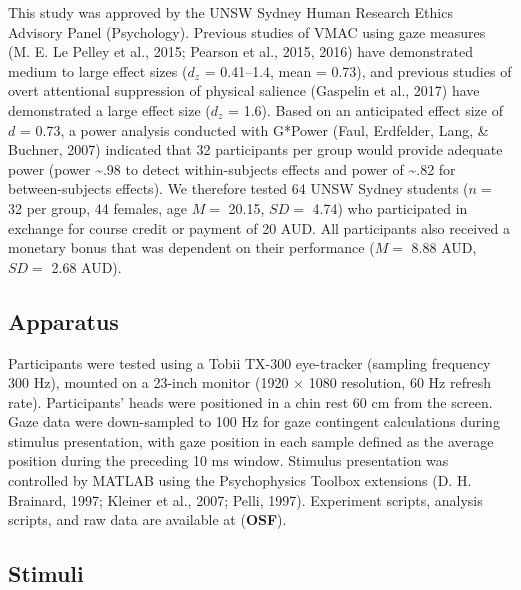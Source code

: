 \documentclass[jou, a4paper, noextraspace,floatsintext]{apa6}
\theoremstyle{definition}
\theoremstyle{definition}
\theoremstyle{definition}
\theoremstyle{remark}
\begin{document}
This study was approved by the UNSW Sydney Human Research Ethics
Advisory Panel (Psychology). Previous studies of VMAC using gaze
measures (M. E. Le Pelley et al., 2015; Pearson et al., 2015, 2016) have
demonstrated medium to large effect sizes (\(d_z\) = 0.41--1.4, mean =
0.73), and previous studies of overt attentional suppression of physical
salience (Gaspelin et al., 2017) have demonstrated a large effect size
(\(d_z\) = 1.6). Based on an anticipated effect size of \(d\) = 0.73, a
power analysis conducted with G*Power (Faul, Erdfelder, Lang, \&
Buchner, 2007) indicated that 32 participants per group would provide
adequate power (power \textasciitilde{}.98 to detect within-subjects
effects and power of \textasciitilde{}.82 for between-subjects effects).
We therefore tested 64 UNSW Sydney students (\(n =\) 32 per group, 44
females, age \(M=\) 20.15, \(SD=\) 4.74) who participated in exchange
for course credit or payment of 20 AUD. All participants also received a
monetary bonus that was dependent on their performance (\(M =\) 8.88
AUD, \(SD =\) 2.68 AUD).

\subsection{Apparatus}\label{apparatus}

Participants were tested using a Tobii TX-300 eye-tracker (sampling
frequency 300 Hz), mounted on a 23-inch monitor (1920 \(\times\) 1080
resolution, 60 Hz refresh rate). Participants' heads were positioned in
a chin rest 60 cm from the screen. Gaze data were down-sampled to 100 Hz
for gaze contingent calculations during stimulus presentation, with gaze
position in each sample defined as the average position during the
preceding 10 ms window. Stimulus presentation was controlled by MATLAB
using the Psychophysics Toolbox extensions (D. H. Brainard, 1997;
Kleiner et al., 2007; Pelli, 1997). Experiment scripts, analysis
scripts, and raw data are available at (\textbf{OSF}).

\subsection{Stimuli}\label{stimuli}
\end{document}
